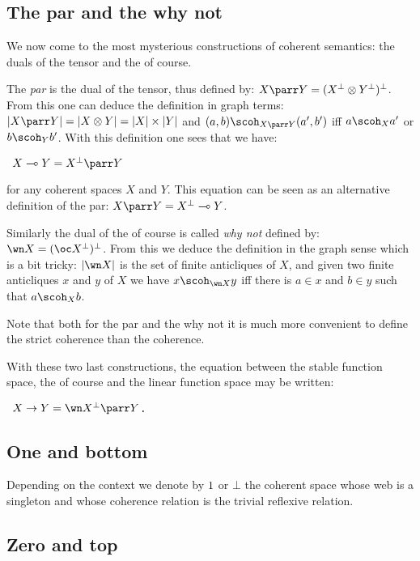 \subsection{The par and the why not}\label{the-par-and-the-why-not}

We now come to the most mysterious constructions of coherent semantics:
the duals of the tensor and the of course.

The \emph{par} is the dual of the tensor, thus defined by:
\(X\parr Y = (X\orth\tens Y\orth)\orth\). From this one can deduce the
definition in graph terms:
\(\web{X\parr Y} = \web{X\tens Y} = \web X\times \web Y\) and
\((a,b)\scoh_{X\parr Y} (a',b')\) iff \(a\scoh_X a'\) or
\(b\scoh_Y b'\). With this definition one sees that we have:

\texttt{~}\(X\limp Y = X\orth\parr Y\)

for any coherent spaces \(X\) and \(Y\). This equation can be seen as an
alternative definition of the par: \(X\parr Y = X\orth\limp Y\).

Similarly the dual of the of course is called \emph{why not} defined by:
\(\wn X = (\oc X\orth)\orth\). From this we deduce the definition in the
graph sense which is a bit tricky: \(\web{\wn X}\) is the set of finite
anticliques of \(X\), and given two finite anticliques \(x\) and \(y\)
of \(X\) we have \(x\scoh_{\wn X} y\) iff there is \(a\in x\) and
\(b\in y\) such that \(a\scoh_X b\).

Note that both for the par and the why not it is much more convenient to
define the strict coherence than the coherence.

With these two last constructions, the equation between the stable
function space, the of course and the linear function space may be
written:

\texttt{~}\(X\imp Y = \wn X\orth\parr Y\)\texttt{.}

\subsection{One and bottom}\label{one-and-bottom}

Depending on the context we denote by \(1\) or \(\bot\) the coherent
space whose web is a singleton and whose coherence relation is the
trivial reflexive relation.

\subsection{Zero and top}\label{zero-and-top}

